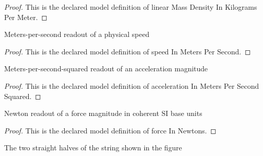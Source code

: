 \begin{proof}
  This is the declared model definition of linear Mass Density In Kilograms Per Meter.
\end{proof}
\begin{definition}
  \label{def:physics:phyx-mini-0242:phyxminiproblems-problemphyxmini0242-speedinmeterspersecond}
  Meters-per-second readout of a physical speed
\end{definition}
\begin{proof}
  This is the declared model definition of speed In Meters Per Second.
\end{proof}
\begin{definition}
  \label{def:physics:phyx-mini-0242:phyxminiproblems-problemphyxmini0242-accelerationinmeterspersecondsquared}
  Meters-per-second-squared readout of an acceleration magnitude
\end{definition}
\begin{proof}
  This is the declared model definition of acceleration In Meters Per Second Squared.
\end{proof}
\begin{definition}
  \label{def:physics:phyx-mini-0242:phyxminiproblems-problemphyxmini0242-forceinnewtons}
  Newton readout of a force magnitude in coherent SI base units
\end{definition}
\begin{proof}
  This is the declared model definition of force In Newtons.
\end{proof}
\begin{definition}
  \label{def:physics:phyx-mini-0242:phyxminiproblems-problemphyxmini0242-stringside}
  The two straight halves of the string shown in the figure
\end{definition}
